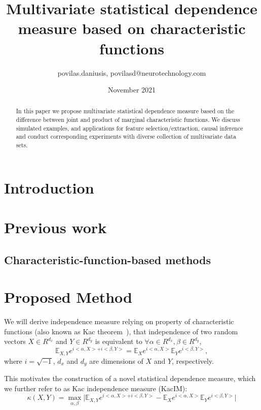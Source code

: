 \documentclass{article}
\title{Multivariate statistical dependence measure based on characteristic functions}
\author{povilas.daniusis, povilasd@neurotechnology.com}
\date{November 2021}
\begin{document}
\maketitle

\begin{abstract}
    In this paper we propose  multivariate statistical dependence measure based on the difference between joint and product of marginal characteristic functions. We discuss simulated examples, and applications for feature selection/extraction, causal inference and conduct corresponding experiments with diverse collection of multivariate data sets.
\end{abstract}

\section{Introduction}

\section{Previous work}
\subsection{Characteristic-function-based methods}

\section{Proposed Method}

We will derive independence measure relying on property of characteristic functions (also known as Kac theorem~\cite{KacTheorem}), that independence of two random vectors $X \in R^{d_{x}}$ and $Y \in R^{d_{y}}$ is equivalent to $\forall \alpha \in R^{d_x}, \beta \in R^{d_y} $, \begin{equation}
\mathbb{E}_{X,Y} e^{i <\alpha, X> + i <\beta, Y>} = \mathbb{E}_{X} e^{i <\alpha, X>} \mathbb{E}_{Y} e^{i <\beta, Y>},
\end{equation}
where $i = \sqrt{-1}$, $d_{x}$ and $d_{y}$ are dimensions of $X$ and $Y$, respectively.

\noindent This motivates the construction of a novel statistical dependence measure, which we further refer to as Kac independence measure (KacIM):
\begin{equation}
\label{eq:kim}
    \kappa(X,Y) = \max_{\alpha, \beta} \vert \mathbb{E}_{X,Y} e^{i <\alpha, X> + i <\beta, Y>} -\mathbb{E}_{X} e^{i <\alpha, X>} \mathbb{E}_{Y} e^{i <\beta, Y>} \vert
\end{equation}
\end{document}
